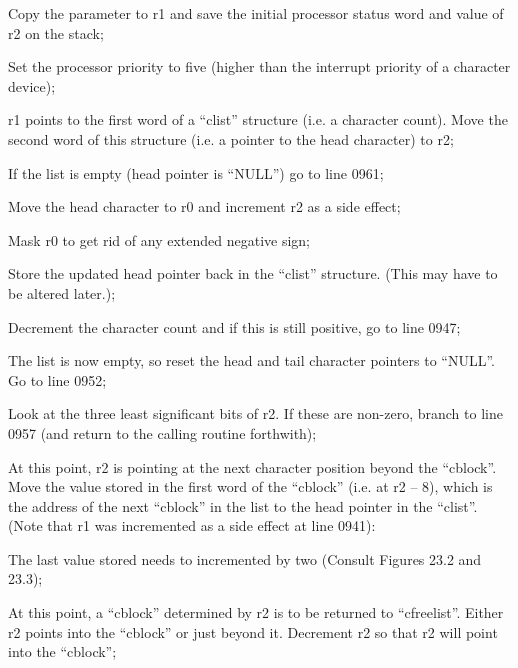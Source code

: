 \bd
\item[0931:] Copy the parameter to r1 and save
the initial processor status word
and value of r2 on the stack;

\item[0934:] Set the processor priority to
five (higher than the interrupt
priority of a character device);

\item[0936:] r1 points to the first word of a
``clist'' structure (i.e. a character count). Move the second word
of this structure (i.e. a pointer
to the head character) to r2;

\item[0937:] If the list is empty (head
pointer is ``NULL'') go to line 0961;

\item[0938:] Move the head character to r0 and
increment r2 as a side effect;

\item[0939:] Mask r0 to get rid of any
extended negative sign;

\item[0940:] Store the updated head pointer
back in the ``clist'' structure.
(This may have to be altered
later.);

\item[0941:] Decrement the character count and
if this is still positive, go to
line 0947;

\item[0942:] The list is now empty, so reset the head and tail
character pointers to ``NULL''. Go to line 0952;

\item[0947:] Look at the three least significant bits of r2. If these are
non-zero, branch to line 0957
(and return to the calling routine forthwith);

\item[0949:] At this point, r2 is pointing at
the next character position
beyond the ``cblock''. Move the
value stored in the first word of
the ``cblock'' (i.e. at r2 -- 8),
which is the address of the next
``cblock'' in the list to the head
pointer in the ``clist''. (Note
that r1 was incremented as a side
effect at line 0941):

\item[0950:] The last value stored needs to
incremented by two (Consult
Figures 23.2 and 23.3);

\item[0952:] At this point, a
``cblock'' determined by r2 is to be returned to
``cfreelist''. Either r2 points
into the ``cblock'' or just beyond
it. Decrement r2 so that r2 will
point into the ``cblock'';

